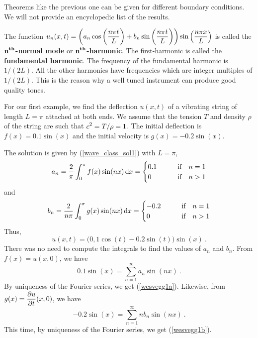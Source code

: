 Theorems like the previous one can be given for different boundary
conditions.  We will not provide an encyclopedic list of the results.

\begin{rmk}
The function
$\displaystyle u_n(x,t) = \left(a_n\cos\left(\frac{n\pi t}{L}\right)
+ b_n \sin\left(\frac{n\pi t}{L}\right)\right)
\sin\left(\frac{n\pi x}{L}\right)$ is called the\\
{\bfseries $\displaystyle \mathbf{n^{th}}$-normal
mode} or {\bfseries $\displaystyle \mathbf{n^{th}}$-harmonic}.  The first-harmonic is called the
{\bfseries fundamental harmonic}.
The frequency of the fundamental harmonic is $1/(2L)$.  All the other
harmonics have frequencies which are integer multiples of $1/(2L)$.  This is
the reason why a well tuned instrument can produce good quality tones.
\end{rmk}

\begin{egg}
For our first example, we find the deflection $u(x,t)$ of a vibrating
string of length $L=\pi$ attached at both ends.  We assume that the
tension $T$ and density $\rho$ of the string are such that
$\displaystyle c^2 = T/\rho = 1$.  The initial deflection is
$f(x) = 0.1 \sin(x)$ and the initial velocity is $g(x) = -0.2 \sin(x)$.

The solution is given by (\ref{wave_class_sol1}) with $L=\pi$,
\begin{equation} \label{wesvegg1a}
a_n = \frac{2}{\pi} \int_0^\pi f(x) \sin(n x) \,\mathrm{d}{x} =
\begin{cases}
0.1 & \qquad \text{if} \quad n=1 \\
0 & \qquad \text{if} \quad n>1 \\
\end{cases}
\end{equation}
and
\begin{equation} \label{wesvegg1b}
b_n = \frac{2}{n\pi} \int_0^\pi g(x) \sin(n x) \,\mathrm{d}{x} =
\begin{cases}
-0.2 & \qquad \text{if} \quad n=1 \\
0 & \qquad \text{if} \quad n>1 \\
\end{cases}
\end{equation}
Thus,
\[
u(x,t) = \big(0,1 \cos(t) - 0.2 \sin(t) \big) \sin(x) \ .
\]
There was no need to compute the integrals to find the values of $a_n$
and $b_n$.  From $f(x) = u(x,0)$, we have
\[
0.1 \sin(x) = \sum_{n=1}^\infty a_n \sin(n x) \ .
\]
By uniqueness of the Fourier series, we get (\ref{wesvegg1a}).  Likewise,
from $\displaystyle g(x) = \frac{\partial{u}}{\partial t}(x,0)$, we have
\[
-0.2 \sin(x) = \sum_{n=1}^\infty n b_n \sin(n x) \ .
\]
This time, by uniqueness of the Fourier series, we get
(\ref{wesvegg1b}).
\end{egg}

